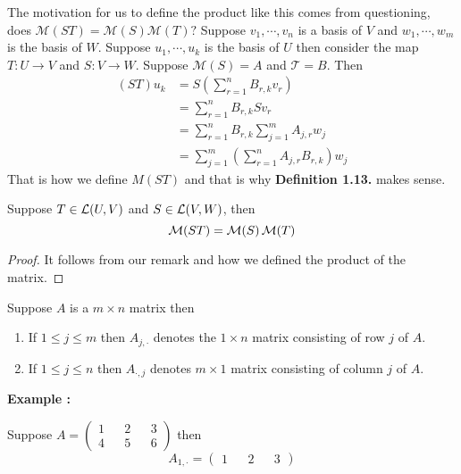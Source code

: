 \begin{remark}
    The motivation for us to define the product like this comes from questioning, does $\mathcal{M}(ST)=\mathcal{M}(S) \mathcal{M}(T)?$
    Suppose $v_1, \cdots, v_n$ is a basis of $V$ and $w_1, \cdots, w_m$ is the basis of $W$. Suppose $u_1, \cdots, u_k$ is the basis of
    $U$ then consider the map $T : U \to V$ and $S : V \to W$. Suppose 
    $\mathcal{M}(S)=A$ and $\mathcal{T}=B$. Then
    \begin{align*}
        (ST)u_k &= S\left( \sum_{r=1}^{n} B_{r,k} v_r \right) \\
        &= \sum_{r=1}^{n} B_{r,k} Sv_r \\
        &= \sum_{r=1}^{n} B_{r,k} \sum_{j=1}^{m} A_{j,r} w_j \\
        &= \sum_{j=1}^{m} \left( \sum_{r=1}^{n} A_{j,r} B_{r,k}  \right) w_j
    \end{align*}
    That is how we define $M(ST)$ and that is why \textbf{Definition 1.13.} makes sense.
\end{remark}

\begin{proposition}
    Suppose $T \in \operatorname{\mathcal{L}}(U,V)$ and $S \in \operatorname{\mathcal{L}}(V,W)$, then 
    \[ \operatorname{\mathcal{M}}(ST)=\operatorname{\mathcal{M}}(S) \operatorname{\mathcal{M}}(T) \]
\end{proposition}

\begin{proof}
    It follows from our remark and how we defined the product of the matrix.
\end{proof}

\begin{definition}
    Suppose $A$ is a $m \times n$ matrix then
    \begin{enumerate}
        \item If $1 \le j \le m$ then $A_{j,\cdot}$ denotes the $1 \times n$ matrix consisting of row $j$ of $A$.
        \item If $1 \le j \le n$ then $A_{\cdot, j}$ denotes $m \times 1$ matrix consisting of column $j$ of $A$.
    \end{enumerate} 
\end{definition}

\textbf{Example :}

Suppose $A = \begin{pmatrix}
    1 && 2 && 3 \\
    4 && 5 && 6
\end{pmatrix}$ then 
\[
 A_{1, \cdot} = \begin{pmatrix}
    1 && 2 && 3
\end{pmatrix}
\] 

